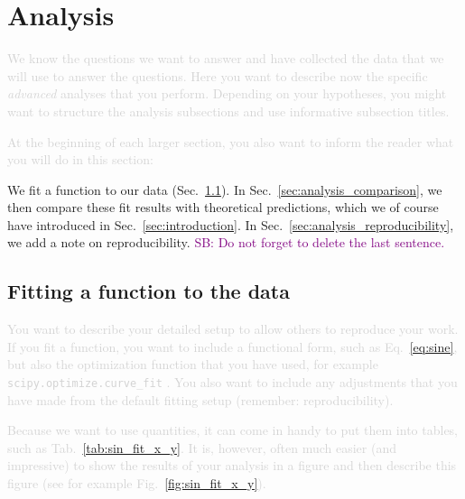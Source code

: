 \documentclass[fleqn,usenatbib]{mnras}
\newcommand{\SB}[1]{{\textcolor{purple}{SB: #1}}}
\newcommand{\comment}[1]{\textcolor{lightgray}{#1}}
\begin{document}
\section{Analysis} \label{sec:analysis}

\comment{We know the questions we want to answer and have collected the data that we will use to answer the questions. Here you want to describe now the specific \textit{advanced} analyses that you perform. Depending on your hypotheses, you might want to structure the analysis subsections and use informative subsection titles.}

\comment{At the beginning of each larger section, you also want to inform the reader what you will do in this section:}

We fit a function to our data (Sec.~\ref{sec:analysis_fitting}). In Sec.~\ref{sec:analysis_comparison}, we then compare these fit results with theoretical predictions, which we of course have introduced in Sec.~\ref{sec:introduction}. In Sec.~\ref{sec:analysis_reproducibility}, we add a note on reproducibility. \SB{Do not forget to delete the last sentence.}

\subsection{Fitting a function to the data} \label{sec:analysis_fitting}

\comment{You want to describe your detailed setup to allow others to reproduce your work. If you fit a function, you want to include a functional form, such as Eq.~\ref{eq:sine}, but also the optimization function that you have used, for example \texttt{scipy.optimize.curve\_fit} \citep{Scipy}. You also want to include any adjustments that you have made from the default fitting setup (remember: reproducibility).}

\comment{Because we want to use quantities, it can come in handy to put them into tables, such as Tab.~\ref{tab:sin_fit_x_y}. It is, however, often much easier (and impressive) to show the results of your analysis in a figure and then describe this figure (see for example Fig.~\ref{fig:sin_fit_x_y}).}


\end{document}
